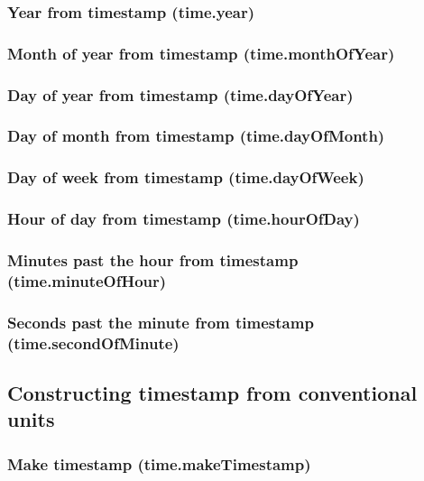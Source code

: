 \documentclass{article}
\theoremstyle{definition}
\begin{document}
\subsubsection{Year from timestamp (time.year)}

\subsubsection{Month of year from timestamp (time.monthOfYear)}

\subsubsection{Day of year from timestamp (time.dayOfYear)}

\subsubsection{Day of month from timestamp (time.dayOfMonth)}

\subsubsection{Day of week from timestamp (time.dayOfWeek)}

\subsubsection{Hour of day from timestamp (time.hourOfDay)}

\subsubsection{Minutes past the hour from timestamp (time.minuteOfHour)}

\subsubsection{Seconds past the minute from timestamp (time.secondOfMinute)}

\subsection{Constructing timestamp from conventional units}

\subsubsection{Make timestamp (time.makeTimestamp)}
\end{document}
